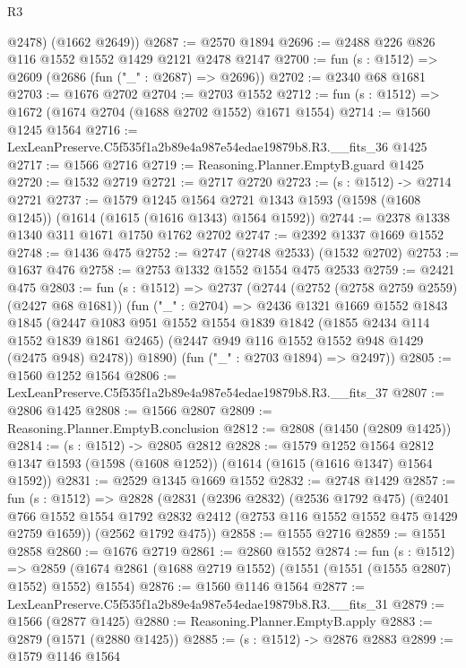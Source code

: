 \begin{lexlean}{R3}
\begin{coremodule}
        @2478)
      (@1662 @2649))
@2687 := @2570 @1894
@2696 := @2488 @226 @826 @116 @1552 @1552 @1429 @2121 @2478 @2147
@2700 := fun (s : @1512) => @2609 (@2686 (fun ("_" : @2687) => @2696))
@2702 := @2340 @68 @1681
@2703 := @1676 @2702
@2704 := @2703 @1552
@2712 := fun (s : @1512) => @1672 (@1674 @2704 (@1688 @2702 @1552) @1671 @1554)
@2714 := @1560 @1245 @1564
@2716 := LexLeanPreserve.C5f535f1a2b89e4a987e54edae19879b8.R3.__fits_36 @1425
@2717 := @1566 @2716
@2719 := Reasoning.Planner.EmptyB.guard @1425
@2720 := @1532 @2719
@2721 := @2717 @2720
@2723 := (s : @1512) -> @2714 @2721
@2737 := @1579
    @1245
    @1564
    @2721
    @1343
    @1593
    (@1598 (@1608 @1245))
    (@1614 (@1615 (@1616 @1343) @1564 @1592))
@2744 := @2378 @1338 @1340 @311 @1671 @1750 @1762 @2702
@2747 := @2392 @1337 @1669 @1552
@2748 := @1436 @475
@2752 := @2747 (@2748 @2533) (@1532 @2702)
@2753 := @1637 @476
@2758 := @2753 @1332 @1552 @1554 @475 @2533
@2759 := @2421 @475
@2803 := fun (s : @1512) =>
  @2737
    (@2744
      (@2752 (@2758 @2759 @2559) (@2427 @68 @1681))
      (fun ("_" : @2704) =>
      @2436
        @1321
        @1669
        @1552
        @1843
        @1845
        (@2447
          @1083
          @951
          @1552
          @1554
          @1839
          @1842
          (@1855 @2434 @114 @1552 @1839 @1861 @2465)
          (@2447 @949 @116 @1552 @1552 @948 @1429 (@2475 @948) @2478))
        @1890)
      (fun ("_" : @2703 @1894) => @2497))
@2805 := @1560 @1252 @1564
@2806 := LexLeanPreserve.C5f535f1a2b89e4a987e54edae19879b8.R3.__fits_37
@2807 := @2806 @1425
@2808 := @1566 @2807
@2809 := Reasoning.Planner.EmptyB.conclusion
@2812 := @2808 (@1450 (@2809 @1425))
@2814 := (s : @1512) -> @2805 @2812
@2828 := @1579
    @1252
    @1564
    @2812
    @1347
    @1593
    (@1598 (@1608 @1252))
    (@1614 (@1615 (@1616 @1347) @1564 @1592))
@2831 := @2529 @1345 @1669 @1552
@2832 := @2748 @1429
@2857 := fun (s : @1512) =>
  @2828
    (@2831
      (@2396 @2832)
      (@2536 @1792 @475)
      (@2401 @766 @1552 @1554 @1792 @2832 @2412 (@2753 @116 @1552 @1552 @475 @1429 @2759 @1659))
      (@2562 @1792 @475))
@2858 := @1555 @2716
@2859 := @1551 @2858
@2860 := @1676 @2719
@2861 := @2860 @1552
@2874 := fun (s : @1512) =>
  @2859 (@1674 @2861 (@1688 @2719 @1552) (@1551 (@1551 (@1555 @2807) @1552) @1552) @1554)
@2876 := @1560 @1146 @1564
@2877 := LexLeanPreserve.C5f535f1a2b89e4a987e54edae19879b8.R3.__fits_31
@2879 := @1566 (@2877 @1425)
@2880 := Reasoning.Planner.EmptyB.apply
@2883 := @2879 (@1571 (@2880 @1425))
@2885 := (s : @1512) -> @2876 @2883
@2899 := @1579
    @1146
    @1564

\end{coremodule}
\end{lexlean}
